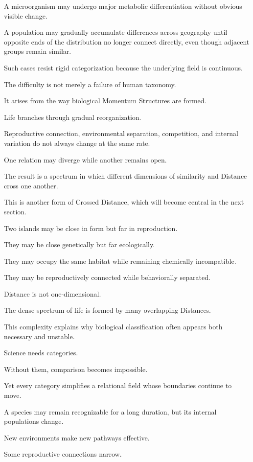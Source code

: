 A microorganism may undergo major metabolic differentiation without obvious visible change.

A population may gradually accumulate differences across geography until opposite ends of the distribution no longer connect directly, even though adjacent groups remain similar.

Such cases resist rigid categorization because the underlying field is continuous.

The difficulty is not merely a failure of human taxonomy.

It arises from the way biological Momentum Structures are formed.

Life branches through gradual reorganization.

Reproductive connection, environmental separation, competition, and internal variation do not always change at the same rate.

One relation may diverge while another remains open.

The result is a spectrum in which different dimensions of similarity and Distance cross one another.

This is another form of Crossed Distance, which will become central in the next section.

Two islands may be close in form but far in reproduction.

They may be close genetically but far ecologically.

They may occupy the same habitat while remaining chemically incompatible.

They may be reproductively connected while behaviorally separated.

Distance is not one-dimensional.

The dense spectrum of life is formed by many overlapping Distances.

This complexity explains why biological classification often appears both necessary and unstable.

Science needs categories.

Without them, comparison becomes impossible.

Yet every category simplifies a relational field whose boundaries continue to move.

A species may remain recognizable for a long duration, but its internal populations change.

New environments make new pathways effective.

Some reproductive connections narrow.

